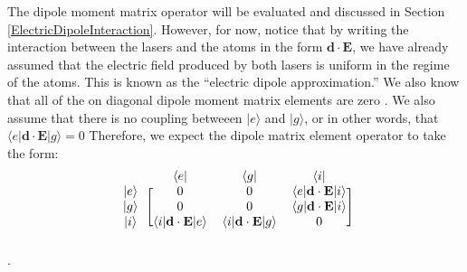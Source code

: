 The dipole moment matrix operator will be evaluated and discussed in Section\,\ref{ElectricDipoleInteraction}. However, for now, notice that by writing the interaction between the lasers and the atoms in the form $\mathbf{d}\cdot\mathbf{E}$, we have already assumed that the electric field produced by both lasers is uniform in the regime of the atoms. This is known as the ``electric dipole approximation.'' We also know that all of the on diagonal dipole moment matrix elements are zero \cite{cohenTannoudji}. We also assume that there is no coupling betweeen $|e\rangle$ and $|g\rangle$, or in other words, that $\langle e|\mathbf{d}\cdot\mathbf{E}|g\rangle=0$ Therefore, we expect the dipole matrix element operator to take the form: 
\begin{equation}
\label{VSchrod}
\begin{blockarray}{cccc}
&\langle e| & \langle g| & \langle i|\\
\begin{block}{c[ccc]}
|e\rangle & 0 & 0 & \langle e |\mathbf{d}\cdot\mathbf{E}|i\rangle \\
|g\rangle & 0 & 0 & \langle g |\mathbf{d}\cdot\mathbf{E}|i\rangle\\
|i\rangle & \langle i |\mathbf{d}\cdot\mathbf{E}|e\rangle & \langle i |\mathbf{d}\cdot\mathbf{E}|g\rangle& 0 \\
\end{block} 
\end{blockarray}
\end{equation}.


